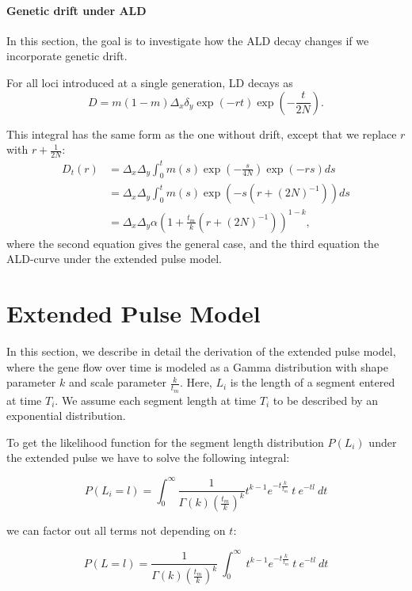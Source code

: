 \documentclass[11pt]{article}
\let\oldparagraph\paragraph
\renewcommand{\paragraph}[1]{\oldparagraph{#1}\mbox{}}
\begin{document}
\paragraph{Genetic drift under ALD}
In this section, the goal is to investigate how the ALD decay changes if we incorporate genetic drift.

For all loci introduced at a single generation, LD decays as \cite{loh_inferring_2013}
$$D = m(1-m)\Delta_x\delta_y\exp(-rt)\exp(-\frac{t}{2N}).$$

This integral has the same form as the one without drift, except that we replace $r$ with $r + \frac{1}{2N}$:
\begin{align}
    D_t(r) &= \Delta_x\Delta_y\int_0^t m(s)\exp\left(-\frac{s}{4N}\right)\exp(-rs) ds \nonumber\\
        &= \Delta_x\Delta_y\int_0^t
        m(s)\exp\left(-s(r+(2N)^{-1})\right) ds \label{eq:ld_drift}\\
&= \Delta_x\Delta_y \alpha\left(1 + \frac{t_m}{k} (r+(2N)^{-1})\right) ^{1-k} ,
\end{align}
where the second equation gives the general case, and the third equation the ALD-curve under the extended pulse model. 

\section{Extended Pulse Model}

In this section, we describe in detail the derivation of the extended pulse model, where the gene flow over time is modeled as a Gamma distribution with shape parameter $k$ and scale parameter $\frac{k}{t_m}$. Here, $L_i$ is the length of a segment entered at time $T_i$. We assume each segment length at time $T_i$ to be described by an exponential distribution.

To get the likelihood function for the segment length distribution $P(L_i)$ under the extended pulse we have to solve the following integral:

\begin{equation}
\label{eq:Likelihood_function_extended_pulse_1}
    P(L_i=l) = \int_{0}^{\infty} \frac{1}{\Gamma(k)(\frac{t_m}{k})^k}t^{k-1}e^{-t\frac{k}{t_m}}\ t\ e^{-tl} \ dt 
\end{equation}

we can factor out all terms not depending on $t$:

\begin{equation}
\label{eq:Likelihood_function_extended_pulse_2}
    P(L=l) = \frac{1}{\Gamma(k)(\frac{t_m}{k})^k}\ \int_{0}^{\infty}\ t^{k-1}e^{-t\frac{k}{t_m}}\ t\ e^{-tl} \ dt 
\end{equation}
\end{document}
